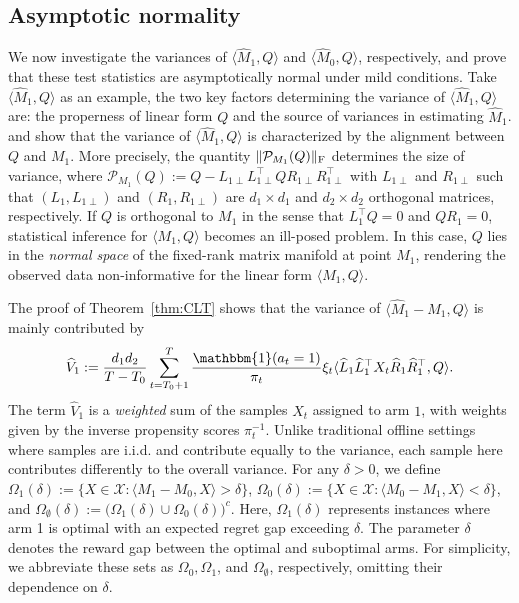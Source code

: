 \documentclass[12pt]{article}
\newcommand{\inp}[2]{\langle #1,#2\rangle}
\def\calP{{\mathcal P}}
\def\calX{{\mathcal X}}
\def\hat{\widehat}
\theoremstyle{plain}
\begin{document}
\subsection{Asymptotic normality}

We now investigate the variances of $\langle \hat M_1, Q\rangle$ and $\langle \hat M_0, Q\rangle$, respectively, and prove that these test statistics are asymptotically normal under mild conditions. Take $\langle \hat M_1, Q\rangle$ as an example, the two key factors  determining the variance of $\langle \hat M_1, Q\rangle$ are: the properness of linear form $Q$ and the source of variances in estimating $\hat M_1$. \cite{xia2021statistical} and \cite{ma2023multiple} show that the variance of $\langle \hat M_1, Q\rangle$ is characterized by the alignment between $Q$ and $M_1$. More precisely, the quantity $\|\calP_{M_1}(Q)\|_{\rm F}$ determines the size of variance, where 
$
\calP_{M_1}(Q):=Q-L_{1\perp}L_{1\perp}^{\top}Q R_{1\perp}R_{1\perp}^{\top}
$
with $L_{1\perp}$ and $R_{1\perp}$ such that $(L_1, L_{1\perp})$ and $(R_1, R_{1\perp})$ are $d_1\times d_1$ and $d_2\times d_2$ orthogonal matrices, respectively. If $Q$ is orthogonal to $M_1$ in the sense that $L_1^{\top}Q=0$ and $QR_1=0$, statistical inference for $\langle M_1, Q\rangle$ becomes an ill-posed problem. In this case, $Q$ lies in the \emph{normal space} of the fixed-rank matrix manifold at point $M_1$, rendering the observed data non-informative for the linear form $\langle M_1, Q\rangle$. 

The proof of Theorem~\ref{thm:CLT} shows that the variance of $\inp{\widehat{M}_1-M_1}{Q}$ is mainly contributed by 
\begin{align*}
   \widehat{V}_{1}:=\frac{d_1d_2}{T-T_0}\sum_{t=T_0+1}^T \frac{\mathbbm{1}(a_t=1)}{\pi_t}\xi_t\inp{\hat L_1\hat L_1^{\top} X_t \hat R_1\hat R_1^{\top}}{Q}.
\end{align*}
The term $\widehat{V}_1$ is a \emph{weighted} sum of the samples $X_t$ assigned to arm $1$, with weights given by the inverse propensity scores $\pi_t^{-1}$. Unlike traditional offline settings where samples are i.i.d. and contribute equally to the variance, each sample here contributes differently to the overall variance. For any $\delta>0$, we define $\Omega_1(\delta):=\big\{X\in\calX: \inp{M_1-M_0}{X}>\delta \big\}$, $\Omega_0(\delta):=\big\{X\in\calX: \inp{M_0-M_1}{X} <\delta \big\}$, and $\Omega_{\emptyset}(\delta):=\big(\Omega_1(\delta)\cup\Omega_0(\delta)\big)^c$. Here, $\Omega_1(\delta)$  represents instances where arm 1 is optimal with an expected regret gap exceeding $\delta$. The parameter $\delta$ denotes the reward gap between the optimal and suboptimal arms. For simplicity, we abbreviate these sets as $\Omega_0, \Omega_1$, and $ \Omega_{\emptyset}$, respectively, omitting their dependence on $\delta$. 
\end{document}
